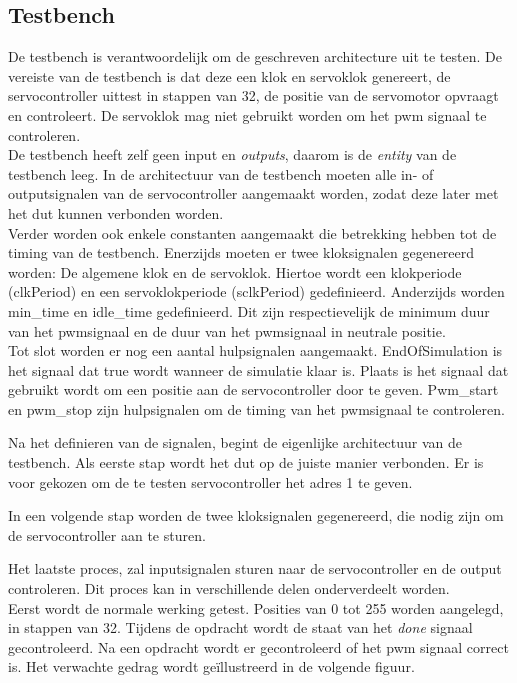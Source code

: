 \subsection{Testbench}

De testbench is verantwoordelijk om de geschreven architecture uit te testen. De vereiste van de testbench is dat deze een klok en servoklok genereert, de servocontroller uittest in stappen van 32, de positie van de servomotor opvraagt en controleert. De servoklok mag niet gebruikt worden om het \gls{pwm} signaal te controleren.\\

\noindent
De testbench heeft zelf geen input en \textit{outputs}, daarom is de \textit{entity} van de testbench leeg. In de architectuur van de testbench moeten alle in- of outputsignalen  van de servocontroller aangemaakt worden, zodat deze later met het \gls{dut} kunnen verbonden worden.\\

\noindent
Verder worden ook enkele constanten aangemaakt die betrekking hebben tot de timing van de testbench. Enerzijds moeten er twee kloksignalen gegenereerd worden: De algemene klok en de servoklok. Hiertoe wordt een klokperiode (clkPeriod) en een servoklokperiode (sclkPeriod) gedefinieerd. Anderzijds worden min\_time en idle\_time gedefinieerd. Dit zijn respectievelijk de minimum duur van het \gls{pwm}signaal en de duur van het \gls{pwm}signaal in neutrale positie.\\

\noindent
Tot slot worden er nog een aantal hulpsignalen aangemaakt. EndOfSimulation is het signaal dat true wordt wanneer de simulatie klaar is. Plaats is het signaal dat gebruikt wordt om een positie aan de servocontroller door te geven. Pwm\_start en pwm\_stop zijn hulpsignalen om de timing van het \gls{pwm}signaal te controleren. 


Na het definieren van de signalen, begint de eigenlijke architectuur van de testbench. Als eerste stap wordt het \gls{dut} op de juiste manier verbonden. Er is voor gekozen om de te testen servocontroller het adres 1 te geven.


In een volgende stap worden de twee kloksignalen gegenereerd, die nodig zijn om de servocontroller aan te sturen.

Het laatste proces, zal inputsignalen sturen naar de servocontroller en de output controleren. Dit proces kan in verschillende delen onderverdeelt worden.\\
\noindent
Eerst wordt de normale werking getest. Posities van 0 tot 255 worden aangelegd, in stappen van 32. Tijdens de opdracht wordt de staat van het \textit{done} signaal gecontroleerd. Na een opdracht wordt er gecontroleerd of het \gls{pwm} signaal correct is. Het verwachte gedrag wordt ge\"{i}llustreerd in de volgende figuur.\\

